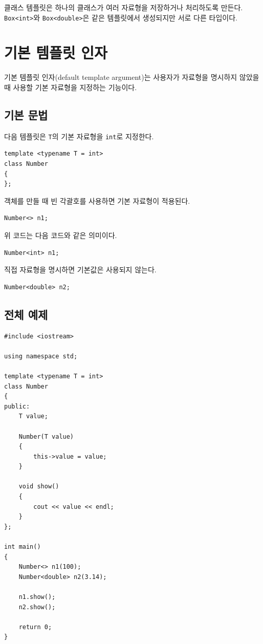 \documentclass[11pt,a4paper]{article}
\begin{document}
\begin{importantbox}
클래스 템플릿은 하나의 클래스가 여러 자료형을 저장하거나 처리하도록 만든다. \texttt{Box<int>}와 \texttt{Box<double>}은 같은 템플릿에서 생성되지만 서로 다른 타입이다.
\end{importantbox}

\section{기본 템플릿 인자}
기본 템플릿 인자(default template argument)는 사용자가 자료형을 명시하지 않았을 때 사용할 기본 자료형을 지정하는 기능이다.

\subsection{기본 문법}
다음 템플릿은 \texttt{T}의 기본 자료형을 \texttt{int}로 지정한다.

\begin{lstlisting}
template <typename T = int>
class Number
{
};
\end{lstlisting}

객체를 만들 때 빈 각괄호를 사용하면 기본 자료형이 적용된다.

\begin{lstlisting}
Number<> n1;
\end{lstlisting}

위 코드는 다음 코드와 같은 의미이다.

\begin{lstlisting}
Number<int> n1;
\end{lstlisting}

직접 자료형을 명시하면 기본값은 사용되지 않는다.

\begin{lstlisting}
Number<double> n2;
\end{lstlisting}

\subsection{전체 예제}
\begin{lstlisting}
#include <iostream>

using namespace std;

template <typename T = int>
class Number
{
public:
    T value;

    Number(T value)
    {
        this->value = value;
    }

    void show()
    {
        cout << value << endl;
    }
};

int main()
{
    Number<> n1(100);
    Number<double> n2(3.14);

    n1.show();
    n2.show();

    return 0;
}
\end{lstlisting}
\end{document}
